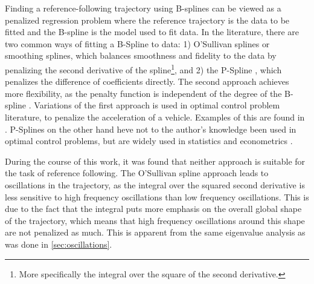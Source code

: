 Finding a reference-following trajectory using B-splines can be viewed as a penalized regression problem where the reference trajectory is the data to be fitted and the B-spline is the model used to fit data. In the literature, there are two common ways of fitting a B-Spline to data: 1) O'Sullivan splines \citep{OSullivan1986} or smoothing splines, which balances smoothness and fidelity to the data by penalizing the second derivative of the spline\footnote{More specifically the integral over the square of the second derivative.}, and 2) the P-Spline \citep{Eilers1996}, which penalizes the difference of coefficients directly. The second approach achieves more flexibility, as the penalty function is independent of the degree of the B-spline \citep{Eilers2021}. Variations of the first approach is used in optimal control problem literature, to penalize the acceleration of a vehicle. Examples of this are found in \cite{mercy2017spline, van2015b}. P-Splines on the other hand heve not to the author's knowledge been used in optimal control problems, but are widely used in statistics and econometrics \citep{Eilers2021}.

During the course of this work, it was found that neither approach is suitable for the task of reference following. The O'Sullivan spline approach leads to oscillations in the trajectory, as the integral over the squared second derivative is less sensitive to high frequency oscillations than low frequency oscillations. This is due to the fact that the integral puts more emphasis on the overall global shape of the trajectory, which means that high frequency oscillations around this shape are not penalized as much. This is apparent from the same eigenvalue analysis as was done in \cref{sec:oscillations}.


